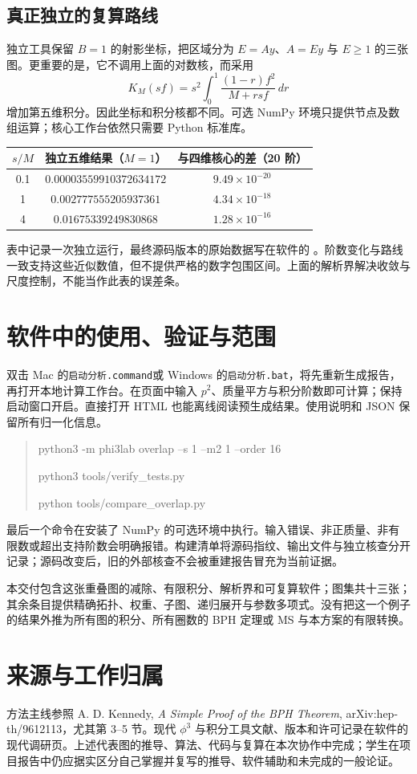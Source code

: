 \documentclass[UTF8,fontset=fandol,11pt]{ctexart}
\begin{document}
\subsection{真正独立的复算路线}
独立工具保留 $B=1$ 的射影坐标，把区域分为 $E=A y$、$A=E y$ 与 $E\geq1$ 的三张图。更重要的是，它不调用上面的对数核，而采用
\[
 K_M(sf)=s^2\int_0^1\frac{(1-r)f^2}{M+rsf}\,dr
\]
增加第五维积分。因此坐标和积分核都不同。可选 NumPy 环境只提供节点及数组运算；核心工作台依然只需要 Python 标准库。
\begin{center}
\begin{tabular}{ccc}
\toprule
$s/M$ & 独立五维结果（$M=1$） & 与四维核心的差（20 阶）\\
\midrule
0.1 & $0.00003559910372634172$ & $9.49\times10^{-20}$\\
1 & $0.002777555205937361$ & $4.34\times10^{-18}$\\
4 & $0.01675339249830868$ & $1.28\times10^{-16}$\\
\bottomrule
\end{tabular}
\end{center}
表中记录一次独立运行，最终源码版本的原始数据写在软件的 。阶数变化与路线一致支持这些近似数值，但不提供严格的数字包围区间。上面的解析界解决收敛与尺度控制，不能当作此表的误差条。

\section{软件中的使用、验证与范围}
双击 Mac 的\texttt{启动分析.command}或 Windows 的\texttt{启动分析.bat}，将先重新生成报告，再打开本地计算工作台。在页面中输入 $p^2$、质量平方与积分阶数即可计算；保持启动窗口开启。直接打开 HTML 也能离线阅读预生成结果。使用说明和 JSON 保留所有归一化信息。
\begin{quote}\ttfamily\small
python3 -m phi3lab overlap --s 1 --m2 1 --order 16\par
python3 tools/verify\_tests.py\par
python tools/compare\_overlap.py
\end{quote}
最后一个命令在安装了 NumPy 的可选环境中执行。输入错误、非正质量、非有限数或超出支持阶数会明确报错。构建清单将源码指纹、输出文件与独立核查分开记录；源码改变后，旧的外部核查不会被重建报告冒充为当前证据。

本交付包含这张重叠图的减除、有限积分、解析界和可复算软件；图集共十三张；其余条目提供精确拓扑、权重、子图、递归展开与参数多项式。没有把这一个例子的结果外推为所有图的积分、所有圈数的 BPH 定理或 MS 与本方案的有限转换。

\section*{来源与工作归属}
方法主线参照 A. D. Kennedy, \emph{A Simple Proof of the BPH Theorem}, arXiv:hep-th/9612113，尤其第 3--5 节。现代 $\phi^3$ 与积分工具文献、版本和许可记录在软件的现代调研页。上述代表图的推导、算法、代码与复算在本次协作中完成；学生在项目报告中仍应据实区分自己掌握并复写的推导、软件辅助和未完成的一般论证。
\end{document}
